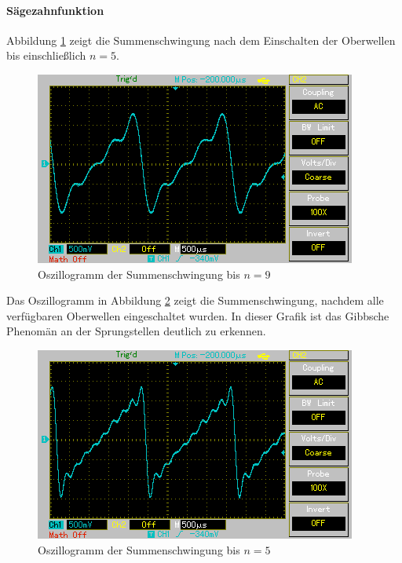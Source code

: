 \documentclass[11pt,ngerman,a4paper]{article}
\begin{document}
\paragraph{S\"agezahnfunktion}
Abbildung \ref{saw_1} zeigt die Summenschwingung nach dem Einschalten der Oberwellen bis einschlie\ss lich $ n = 5$. 
\begin{figure}[htp]
\centering
\includegraphics[scale=0.8]{Screenshots/saw_1.png}
\caption{Oszillogramm  der Summenschwingung bis $n = 9$}
\label{saw_1}
\end{figure}
Das Oszillogramm in Abbildung \ref{saw_2} zeigt die Summenschwingung, nachdem alle verf\"ugbaren Oberwellen eingeschaltet wurden. In dieser Grafik ist das Gibbsche Phenom\"an an der Sprungstellen deutlich zu erkennen.
\begin{figure}[htp]
\centering
\includegraphics[scale=0.8]{Screenshots/saw_2.png}
\caption{Oszillogramm  der Summenschwingung bis $n = 5$}
\label{saw_2}
\end{figure}
\end{document}
